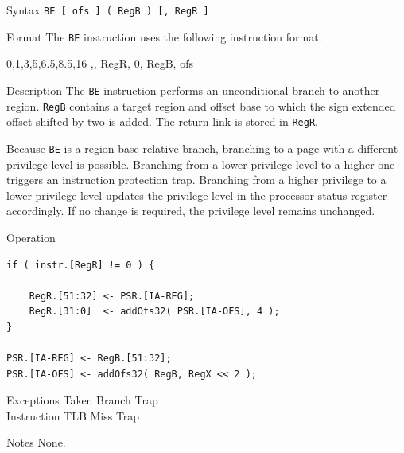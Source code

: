 \pagebreak
{}

\begin{iPageDescEntry}{Syntax}
\texttt{BE [ ofs ] ( RegB ) [, RegR ]}
\end{iPageDescEntry}

\begin{iPageDescEntry}{Format}
The \texttt{BE} instruction uses the following instruction format: \\

\begin{flushleft}
\drawInstrFormat
    {0,1,3,5,6.5,8.5,16}
    {\OpCodeGrpBR,\OpCodeBE, RegR, 0, RegB, ofs}
\end{flushleft}
\end{iPageDescEntry}

\begin{iPageDescEntry}{Description}
The \texttt{BE} instruction performs an unconditional branch to another region. \texttt{RegB} contains a target region and offset base to which the sign extended offset shifted by two is added. The return link is stored in \texttt{RegR}.

Because \texttt{BE} is a region base relative branch, branching to a page with a different privilege level is possible. Branching from a lower privilege level to a higher one triggers an instruction protection trap. Branching from a higher privilege to a lower privilege level updates the privilege level in the processor status register accordingly. If no change is required, the privilege level remains unchanged.  


\end{iPageDescEntry}

\begin{iPageDescOpEntry}{Operation}
\begin{lstlisting}[style=iPageOpStyle]
if ( instr.[RegR] != 0 ) {
	
    RegR.[51:32] <- PSR.[IA-REG];
    RegR.[31:0]  <- addOfs32( PSR.[IA-OFS], 4 );
}

PSR.[IA-REG] <- RegB.[51:32];
PSR.[IA-OFS] <- addOfs32( RegB, RegX << 2 );
\end{lstlisting}
\end{iPageDescOpEntry}

\begin{iPageDescEntry}{Exceptions}
Taken Branch Trap\\
Instruction TLB Miss Trap
\end{iPageDescEntry}

\begin{iPageDescEntry}{Notes}
None.
\end{iPageDescEntry}

